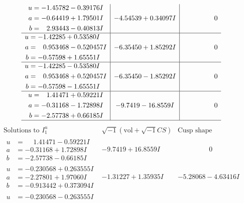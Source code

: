 \documentclass[1p]{elsarticle_modified}
\theoremstyle{definition}
\newcommand{\I}{\sqrt{-1}}
\begin{document}
$$\begin{array}{c|c|c}
\begin{aligned}
u &= -1.45782 - 0.39176 I \\
a &= -0.64419 + 1.79501 I \\
b &= \phantom{-}2.93443 - 0.40813 I\end{aligned}
 & -4.54539 + 0.34097 I & \phantom{-0.000000 } 0 \\ \hline\begin{aligned}
u &= -1.42285 + 0.53580 I \\
a &= \phantom{-}0.953468 - 0.520457 I \\
b &= -0.57598 + 1.65551 I\end{aligned}
 & -6.35450 + 1.85292 I & \phantom{-0.000000 } 0 \\ \hline\begin{aligned}
u &= -1.42285 - 0.53580 I \\
a &= \phantom{-}0.953468 + 0.520457 I \\
b &= -0.57598 - 1.65551 I\end{aligned}
 & -6.35450 - 1.85292 I & \phantom{-0.000000 } 0 \\ \hline\begin{aligned}
u &= \phantom{-}1.41471 + 0.59221 I \\
a &= -0.31168 - 1.72898 I \\
b &= -2.57738 + 0.66185 I\end{aligned}
 & -9.7419 - 16.8559 I & \phantom{-0.000000 } 0\\
 \hline 
 \end{array}$$\newpage$$\begin{array}{c|c|c}  
\text{Solutions to }I^u_{1}& \I (\text{vol} + \sqrt{-1}CS) & \text{Cusp shape}\\
 \hline 
\begin{aligned}
u &= \phantom{-}1.41471 - 0.59221 I \\
a &= -0.31168 + 1.72898 I \\
b &= -2.57738 - 0.66185 I\end{aligned}
 & -9.7419 + 16.8559 I & \phantom{-0.000000 } 0 \\ \hline\begin{aligned}
u &= -0.230568 + 0.263555 I \\
a &= -2.27801 + 1.97060 I \\
b &= -0.913442 + 0.373094 I\end{aligned}
 & -1.31227 + 1.35935 I & -5.28068 - 4.63416 I \\ \hline\begin{aligned}
u &= -0.230568 - 0.263555 I \\

\end{aligned}
\end{array}$$
\end{document}

